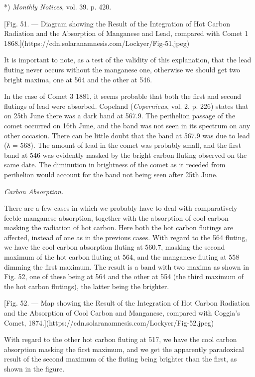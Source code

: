 \documentclass[a4paper, 12pt, oneside, polutonikogreek, english]{article}
\begin{document}
*) \emph{Monthly Notices}, vol. 39. p. 420.

[Fig. 51. --- Diagram showing the Result of the Integration of Hot Carbon Radiation and the Absorption of Manganese and Lead, compared with Comet 1 1868.](https://cdn.solaranamnesis.com/Lockyer/Fig-51.jpeg)

It is important to note, as a test of the validity of this explanation, that the lead fluting never occurs without the manganese one, otherwise we should get two bright maxima, one at 564 and the other at 546.

In the case of Comet 3 1881, it seems probable that both the first and second flutings of lead were absorbed. Copeland (\emph{Copernicus}, vol. 2. p. 226) states that on 25th June there was a dark band at 567.9. The perihelion passage of the comet occurred on 16th June, and the band was not seen in its spectrum on any other occasion. There can be little doubt that the band at 567.9 was due to lead (λ = 568). The amount of lead in the comet was probably small, and the first band at 546 was evidently masked by the bright carbon fluting observed on the same date. The diminution in brightness of the comet as it receded from perihelion would account for the band not being seen after 25th June.

\emph{Carbon Absorption.}

There are a few cases in which we probably have to deal with comparatively feeble manganese absorption, together with the absorption of cool carbon masking the radiation of hot carbon. Here both the hot carbon flutings are affected, instead of one as in the previous cases. With regard to the 564 fluting, we have the cool carbon absorption fluting at 560.7, masking the second maximum of the hot carbon fluting at 564, and the manganese fluting at 558 dimming the first maximum. The result is a band with two maxima as shown in Fig. 52, one of these being at 564 and the other at 554 (the third maximum of the hot carbon flutings), the latter being the brighter.

[Fig. 52. --- Map showing the Result of the Integration of Hot Carbon Radiation and the Absorption of Cool Carbon and Manganese, compared with Coggia's Comet, 1874.](https://cdn.solaranamnesis.com/Lockyer/Fig-52.jpeg)

With regard to the other hot carbon fluting at 517, we have the cool carbon absorption masking the first maximum, and we get the apparently paradoxical result of the second maximum of the fluting being brighter than the first, as shown in the figure.
\end{document}
